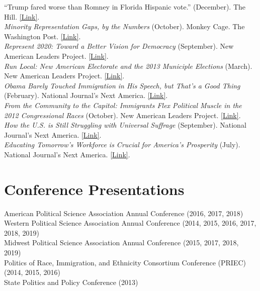 \documentclass[11pt, a4paper]{article}
\newcommand{\years}[1]{\marginnote{\scriptsize #1}}
\begin{document}
\years{2016} ``Trump fared worse than Romney in Florida Hispanic vote.'' (December). The Hill. \href{http://bit.ly/2gNFKOz}{[Link]}.\\
\years{2014}\textit{Minority Representation Gaps, by the Numbers} (October). Monkey Cage. The Washington Post. \href{http://wapo.st/ZGQntG}{[Link]}.\\
\years{}\textit{Represent 2020: Toward a Better Vision for Democracy} (September). New American Leaders Project. \href{http://bit.ly/1tLsVcV}{[Link]}.\\
\years{2013}\textit{Run Local: New American Electorate and the 2013 Municiple Elections} (March). New American Leaders Project. \href{http://bit.ly/WKwtGR}{[Link]}.\\
\years{}\textit{Obama Barely Touched Immigration in His Speech, but That's a Good Thing} (February). National Journal's Next America. \href{http://bit.ly/12R7lVG}{[Link]}.\\
\years{2012}\textit{From the Community to the Capitol: Immigrants Flex Political Muscle in the 2012 Congressional Races} (October). New American Leaders Project. \href{http://bit.ly/RLVzVF}{[Link]}.\\
\years{}\textit{How the U.S. is Still Struggling with Universal Suffrage} (September). National Journal's Next America.  \href{http://bit.ly/UDAUpD}{[Link]}.\\
\years{}\textit{Educating Tomorrow's Workforce is Crucial for America's Prosperity} (July). National Journal's Next America. \href{http://bit.ly/NCHoyf}{[Link]}.\\

\section*{Conference Presentations}

\years{}American Political Science Association Annual Conference (2016, 2017, 2018)\\
\years{}Western Political Science Association Annual Conference (2014, 2015, 2016, 2017, 2018, 2019)\\
\years{}Midwest Political Science Association Annual Conference (2015, 2017, 2018, 2019)\\
\years{}Politics of Race, Immigration, and Ethnicity Consortium Conference (PRIEC) (2014, 2015, 2016)\\
\years{}State Politics and Policy Conference (2013)
\end{document}
